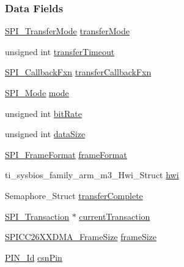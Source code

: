 \subsubsection*{Data Fields}
\begin{DoxyCompactItemize}
\item 
\hyperlink{_s_p_i_8h_ab9ea76c6529d6076eee5e1c4a5a92c6f}{S\-P\-I\-\_\-\-Transfer\-Mode} \hyperlink{struct_s_p_i_c_c26_x_x___object_ab8d46bbfaf042eb2d8d37208b0a0bb89}{transfer\-Mode}
\item 
unsigned int \hyperlink{struct_s_p_i_c_c26_x_x___object_a8ba149946ed7b4059467e8e504998482}{transfer\-Timeout}
\item 
\hyperlink{_s_p_i_8h_aeb03e7608a14021c3b0acf92c90e2168}{S\-P\-I\-\_\-\-Callback\-Fxn} \hyperlink{struct_s_p_i_c_c26_x_x___object_ab119ec24a63c0011973978f60b9348ef}{transfer\-Callback\-Fxn}
\item 
\hyperlink{_s_p_i_8h_a60a7e3d74577b38aa79ea6983362f942}{S\-P\-I\-\_\-\-Mode} \hyperlink{struct_s_p_i_c_c26_x_x___object_ab8bed2c9dfa1520053a1b2eef32db549}{mode}
\item 
unsigned int \hyperlink{struct_s_p_i_c_c26_x_x___object_a96064f0b51ffdf29356164dbd7c614ad}{bit\-Rate}
\item 
unsigned int \hyperlink{struct_s_p_i_c_c26_x_x___object_a37480e975d427acc570778a2fbbd88d8}{data\-Size}
\item 
\hyperlink{_s_p_i_8h_a4e1f33555dfa8147205af5b266f3a489}{S\-P\-I\-\_\-\-Frame\-Format} \hyperlink{struct_s_p_i_c_c26_x_x___object_a01e584aa7d8781d93e9ce4d1e773e12a}{frame\-Format}
\item 
ti\-\_\-sysbios\-\_\-family\-\_\-arm\-\_\-m3\-\_\-\-Hwi\-\_\-\-Struct \hyperlink{struct_s_p_i_c_c26_x_x___object_a6966e1e89b770dc8d352f5cafd84ffb7}{hwi}
\item 
Semaphore\-\_\-\-Struct \hyperlink{struct_s_p_i_c_c26_x_x___object_acf8b67f6c17c97963023d624a189a76c}{transfer\-Complete}
\item 
\hyperlink{struct_s_p_i___transaction}{S\-P\-I\-\_\-\-Transaction} $\ast$ \hyperlink{struct_s_p_i_c_c26_x_x___object_a88eb8e5827da9773b6ac17fe5beaad4a}{current\-Transaction}
\item 
\hyperlink{_s_p_i_c_c26_x_x_d_m_a_8h_a1c5afb8465d3e8689a82088ad25fc81a}{S\-P\-I\-C\-C26\-X\-X\-D\-M\-A\-\_\-\-Frame\-Size} \hyperlink{struct_s_p_i_c_c26_x_x___object_a99cc8a3a78ab2d00c1b1c921eea15cd7}{frame\-Size}
\item 
\hyperlink{_p_i_n_8h_a9ae8197f460bb76ea09a84f47d09921f}{P\-I\-N\-\_\-\-Id} \hyperlink{struct_s_p_i_c_c26_x_x___object_ad61200344ad14b50cd9847e1da964454}{csn\-Pin}

\end{DoxyCompactItemize}
